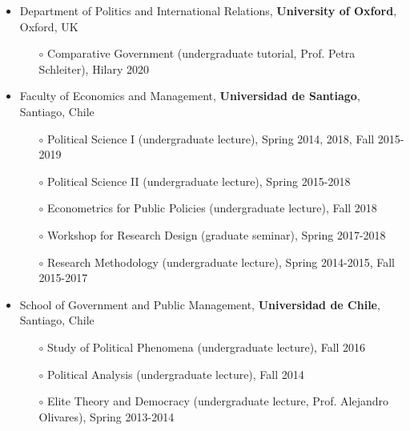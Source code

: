 \begin{publications}

\begin{itemize}
\item{\small Department of Politics and International Relations, {\bfseries University of Oxford}, Oxford, UK}
\begin{itemize}
\item[$\circ$]{\small Comparative Government (undergraduate tutorial, Prof. Petra Schleiter), Hilary 2020}
\end{itemize}
\item{\small Faculty of Economics and Management, {\bfseries Universidad de Santiago}, Santiago, Chile}
\begin{itemize}
\item[$\circ$]{\small Political Science I (undergraduate lecture), Spring 2014, 2018, Fall 2015-2019}
\item[$\circ$]{\small Political Science II (undergraduate lecture), Spring 2015-2018}
\item[$\circ$]{\small Econometrics for Public Policies (undergraduate lecture), Fall 2018}
\item[$\circ$]{\small Workshop for Research Design (graduate seminar), Spring 2017-2018}
\item[$\circ$]{\small Research Methodology (undergraduate lecture), Spring 2014-2015, Fall 2015-2017}
\end{itemize}
\item{\small School of Government and Public Management, {\bfseries Universidad de Chile}, Santiago, Chile}
\begin{itemize}
\item[$\circ$]{\small Study of Political Phenomena (undergraduate lecture), Fall 2016}
\item[$\circ$]{\small Political Analysis (undergraduate lecture), Fall 2014}
\item[$\circ$]{\small Elite Theory and Democracy (undergraduate lecture, Prof. Alejandro Olivares), Spring 2013-2014}
\end{itemize}
\end{itemize}

\vspace{1mm}
\end{publications}
